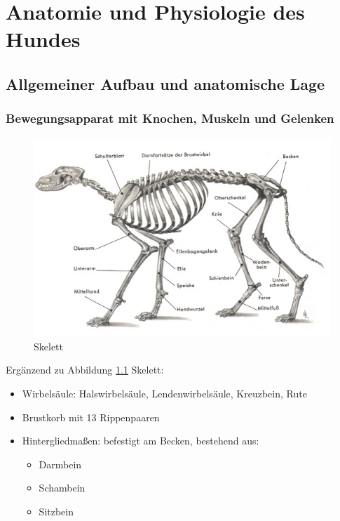 \chapter{Anatomie und Physiologie des Hundes}


\section{Allgemeiner Aufbau und anatomische Lage}

    \subsection{Bewegungsapparat mit Knochen, Muskeln und Gelenken}
    \begin{figure}[ht]
    \centering
    \includegraphics[width=1.0\textwidth]{./bilder/anatomie1.jpg}
    \caption{Skelett}
    \label{Skelett}
    \end{figure}

    \clearpage
    Ergänzend zu Abbildung \ref{Skelett} Skelett:
    \begin{itemize}
        \item Wirbelsäule: Halswirbelsäule, Lendenwirbelsäule, Kreuzbein, Rute
        \item Brustkorb mit 13 Rippenpaaren
        \item Hintergliedmaßen: befestigt am Becken, bestehend aus:
        \begin{itemize}
            \item Darmbein
            \item Schambein
            \item Sitzbein
        \end{itemize}
    \end{itemize}

